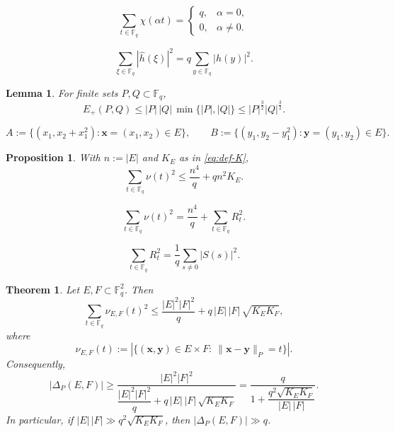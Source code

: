 \documentclass[10pt,a4paper]{amsart}
\newtheorem{lemma}{Lemma}
\newtheorem{proposition}{Proposition}
\newtheorem{theorem}{Theorem}
\newcommand{\F}{\mathbb{F}}
\newcommand{\abs}[1]{\left|#1\right|}
\begin{document}
\begin{equation}\label{eq:orthogonality}
\sum_{t\in \F_q}\chi(\alpha t)=
\begin{cases}
q, & \alpha=0,\\
0, & \alpha\ne 0.
\end{cases}
\end{equation}

\begin{equation}\label{lem:plancherel}
\sum_{\xi\in \F_q}\abs{\widehat{h}(\xi)}^2
=
q\sum_{y\in \F_q}\abs{h(y)}^2.
\end{equation}

\begin{lemma}\label{lem:energy-trivial}
For finite sets $P,Q\subset \F_q$,
\begin{equation*}
E_+(P,Q)
\le
|P|\,|Q|\,\min\{|P|,|Q|\}
\le
|P|^{\frac{3}{2}}|Q|^{\frac{3}{2}}.
\end{equation*}
\end{lemma}

\begin{equation}\label{eq:def-shears}
A:=\{(x_1,x_2+x_1^2):\mathbf{x}=(x_1,x_2)\in E\},
\qquad
B:=\{(y_1,y_2-y_1^2):\mathbf{y}=(y_1,y_2)\in E\}.
\end{equation}

\begin{proposition}\label{prop:second-moment}
With $n:=|E|$ and $K_E$ as in \eqref{eq:def-K},
\begin{equation}\label{eq:second-moment-bound}
\sum_{t\in \F_q}\nu(t)^2
\le
\frac{n^4}{q}+qn^2K_E.
\end{equation}
\end{proposition}

\begin{equation}\label{eq:nu-split}
\sum_{t\in \F_q}\nu(t)^2
=
\frac{n^4}{q}+\sum_{t\in \F_q}R_t^2.
\end{equation}

\begin{equation}\label{eq:R-by-S}
\sum_{t\in \F_q}R_t^2
=
\frac{1}{q}\sum_{s\ne 0}|S(s)|^2.
\end{equation}

\begin{theorem}\label{thm:bipartite}
Let $E,F\subset \F_q^2$. Then
\[
\sum_{t\in\F_q}\nu_{E,F}(t)^2
\le
\frac{|E|^2|F|^2}{q}
+
q\,|E|\,|F|\,\sqrt{K_EK_F},
\]
where
\[
\nu_{E,F}(t):=
\abs{\{(\mathbf{x},\mathbf{y})\in E\times F:\ \|\mathbf{x}-\mathbf{y}\|_P=t\}}.
\]
Consequently,
\[
\abs{\Delta_P(E,F)}
\ge
\frac{|E|^2|F|^2}
{\dfrac{|E|^2|F|^2}{q}+q\,|E|\,|F|\,\sqrt{K_EK_F}}
=
\frac{q}{1+\dfrac{q^2\sqrt{K_EK_F}}{|E|\,|F|}}.
\]
In particular, if $|E|\,|F|\gg q^2\sqrt{K_EK_F}$, then $\abs{\Delta_P(E,F)}\gg q$.
\end{theorem}
\end{document}
